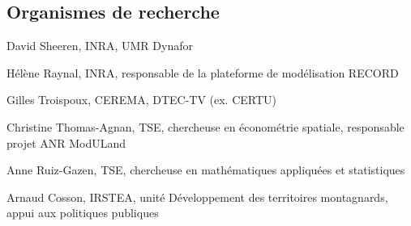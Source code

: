 \subsection{Organismes de recherche}

\startitemize
\item David Sheeren, INRA, UMR Dynafor
\item Hélène Raynal, INRA, responsable de la plateforme de modélisation RECORD
\item Gilles Troispoux, CEREMA, DTEC-TV (ex. CERTU)
\item Christine Thomas-Agnan, TSE, chercheuse en économétrie spatiale, responsable projet ANR ModULand
\item Anne Ruiz-Gazen, TSE, chercheuse en mathématiques appliquées et statistiques
\item Arnaud Cosson, IRSTEA, unité Développement des territoires montagnards, appui aux politiques publiques
\stopitemize
